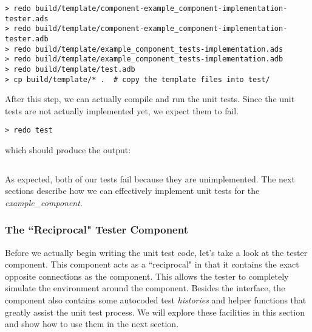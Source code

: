 \vspace{5mm} %
\begin{verbatim}
> redo build/template/component-example_component-implementation-tester.ads
> redo build/template/component-example_component-implementation-tester.adb
> redo build/template/example_component_tests-implementation.ads
> redo build/template/example_component_tests-implementation.adb
> redo build/template/test.adb
> cp build/template/* .  # copy the template files into test/
\end{verbatim}
\vspace{5mm} %

After this step, we can actually compile and run the unit tests. Since the unit tests are not actually implemented yet, we expect them to fail.

\vspace{5mm} %
\begin{verbatim}
> redo test
\end{verbatim}
\vspace{5mm} %

which should produce the output:

\vspace{5mm} %
\inputminted{text}{../example_architecture/example_component/test/output.txt}
\vspace{5mm} %

As expected, both of our tests fail because they are unimplemented. The next sections describe how we can effectively implement unit tests for the \textit{example\_component}.

\subsubsection{The ``Reciprocal" Tester Component}

Before we actually begin writing the unit test code, let's take a look at the tester component. This component acts as a ``reciprocal" in that it contains the exact opposite connections as the component. This allows the tester to completely simulate the environment around the component. Besides the interface, the component also contains some autocoded test \textit{histories} and helper functions that greatly assist the unit test process. We will explore these facilities in this section and show how to use them in the next section. \\

